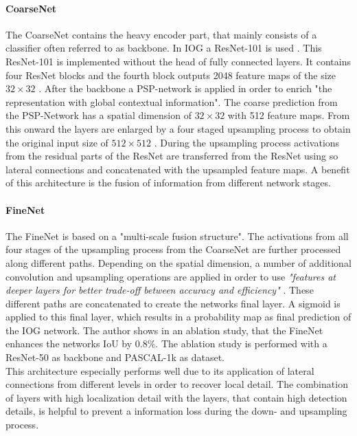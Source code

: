 \paragraph{CoarseNet}
The CoarseNet contains the heavy encoder part, that mainly consists of a classifier often referred to as backbone. In IOG a ResNet-101 \cite{He16-ResNet} is used .
This ResNet-101 is implemented without the head of fully connected layers. It contains four ResNet blocks and the fourth block outputs 2048 feature maps of the size $32 \times 32$ .
After the backbone a PSP-network is applied in order to enrich "the representation with global contextual information"\cite{Zha20-IOG}.
The coarse prediction from the PSP-Network \cite{Zhao17-PSP} has a spatial dimension of  $32 \times 32$  with 512 feature maps. 
From this onward the layers are enlarged by a four staged upsampling process to obtain the original input size of  $512 \times 512$ . 
During the upsampling process activations from the residual parts of the ResNet are transferred from the ResNet using so lateral connections and concatenated with the upsampled feature maps.
A benefit of this architecture is the fusion of information from different network stages.

\paragraph{FineNet}
The FineNet is based on a "multi-scale fusion structure"\cite{Zha20-IOG}. 
The activations from all four stages of the upsampling process from the CoarseNet are further processed along different paths. 
Depending on the spatial dimension, a number of additional convolution and upsampling operations are applied in order to use \emph{"features at deeper layers for better trade-off between accuracy and efficiency"} \cite[p. 12237]{Zha20-IOG}.
These different paths are concatenated to create the networks final layer.
A sigmoid is applied to this final layer, which results in a probability map as final prediction of the IOG network.
The author shows in an ablation study, that the FineNet enhances the networks IoU by $0.8\%$. 
The ablation study is performed with a ResNet-50 as backbone and PASCAL-1k \cite{Eve20-PascalVOC} as dataset. 
\\
This architecture especially performs well due to its application of lateral connections from different levels in order to recover local detail.
The combination of layers with high localization detail with the layers, that contain high detection details, is helpful to prevent a information loss during the down- and upsampling process.

